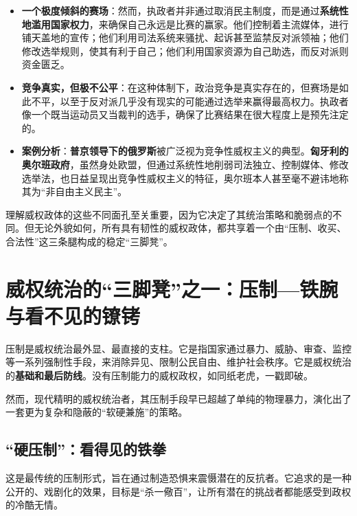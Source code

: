 \begin{itemize}
\begin{itemize}
        \item \textbf{一个极度倾斜的赛场}：然而，执政者并非通过取消民主制度，而是通过\textbf{系统性地滥用国家权力}，来确保自己永远是比赛的赢家。他们控制着主流媒体，进行铺天盖地的宣传；他们利用司法系统来骚扰、起诉甚至监禁反对派领袖；他们修改选举规则，使其有利于自己；他们利用国家资源为自己助选，而反对派则资金匮乏。
        \item \textbf{竞争真实，但极不公平}：在这种体制下，政治竞争是真实存在的，但赛场是如此不平，以至于反对派几乎没有现实的可能通过选举来赢得最高权力。执政者像一个既当运动员又当裁判的选手，确保了比赛结果在很大程度上是预先注定的。
        \item \textbf{案例分析}：\textbf{普京领导下的俄罗斯}被广泛视为竞争性威权主义的典型。\textbf{匈牙利的奥尔班政府}，虽然身处欧盟，但通过系统性地削弱司法独立、控制媒体、修改选举法，也日益呈现出竞争性威权主义的特征，奥尔班本人甚至毫不避讳地称其为“非自由主义民主”。
    \end{itemize}
\end{itemize}

理解威权政体的这些不同面孔至关重要，因为它决定了其统治策略和脆弱点的不同。但无论外貌如何，所有具有韧性的威权政体，都共享着一个由“压制、收买、合法性”这三条腿构成的稳定“三脚凳”。

\section{威权统治的“三脚凳”之一：压制---铁腕与看不见的镣铐}

压制是威权统治最外显、最直接的支柱。它是指国家通过暴力、威胁、审查、监控等一系列强制性手段，来消除异见、限制公民自由、维护社会秩序。它是威权统治的\textbf{基础和最后防线}。没有压制能力的威权政权，如同纸老虎，一戳即破。

然而，现代精明的威权统治者，其压制手段早已超越了单纯的物理暴力，演化出了一套更为复杂和隐蔽的“软硬兼施”的策略。

\subsection{“硬压制”：看得见的铁拳}

这是最传统的压制形式，旨在通过制造恐惧来震慑潜在的反抗者。它追求的是一种公开的、戏剧化的效果，目标是“杀一儆百”，让所有潜在的挑战者都能感受到政权的冷酷无情。

